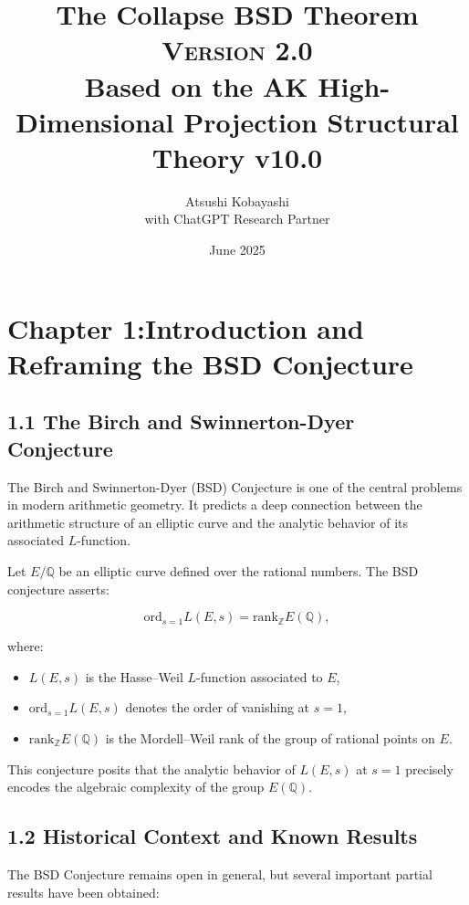 \documentclass[11pt]{article}
\title{The Collapse BSD Theorem \\ 
\Large \textsc{Version 2.0} \\
\small Based on the AK High-Dimensional Projection Structural Theory v10.0}
\author{Atsushi Kobayashi \\ \small with ChatGPT Research Partner}
\date{June 2025}
\newcommand{\QQ}{\mathbb{Q}}
\newcommand{\ZZ}{\mathbb{Z}}
\begin{document}
\maketitle
\tableofcontents
\newpage


\section{Chapter 1:Introduction and Reframing the BSD Conjecture}

\subsection{1.1 The Birch and Swinnerton-Dyer Conjecture}

The Birch and Swinnerton-Dyer (BSD) Conjecture is one of the central problems in modern arithmetic geometry.  
It predicts a deep connection between the arithmetic structure of an elliptic curve and the analytic behavior of its associated $L$-function.

Let $E/\QQ$ be an elliptic curve defined over the rational numbers.  
The BSD conjecture asserts:

\begin{equation}
\label{eq:bsd}
\mathrm{ord}_{s=1} L(E,s) = \mathrm{rank}_{\ZZ} E(\QQ),
\end{equation}

where:
\begin{itemize}
  \item $L(E,s)$ is the Hasse–Weil $L$-function associated to $E$,
  \item $\mathrm{ord}_{s=1} L(E,s)$ denotes the order of vanishing at $s=1$,
  \item $\mathrm{rank}_{\ZZ} E(\QQ)$ is the Mordell–Weil rank of the group of rational points on $E$.
\end{itemize}

This conjecture posits that the analytic behavior of $L(E,s)$ at $s=1$ precisely encodes the algebraic complexity of the group $E(\QQ)$.

\subsection{1.2 Historical Context and Known Results}

The BSD Conjecture remains open in general, but several important partial results have been obtained:
\end{document}
